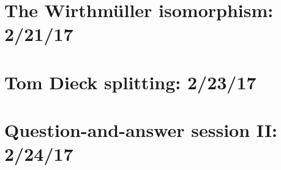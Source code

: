 \documentclass{style_EHT}
\begin{document}
\section{The Wirthmüller isomorphism: 2/21/17}
	
\section{Tom Dieck splitting: 2/23/17}
	
\section{Question-and-answer session II: 2/24/17}
	

{}

\end{document}
